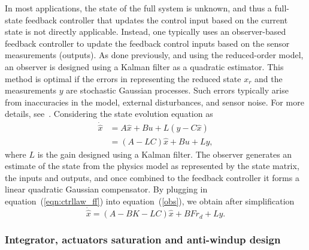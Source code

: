 \documentclass{iopart}
\begin{document}
In most applications, the state of the full system is unknown, and thus a full-state feedback controller that updates the control input based on the current state is not directly applicable. Instead, one typically uses an observer-based feedback controller to update the feedback control inputs based on the sensor measurements (outputs).
As done previously, and using the reduced-order model, an observer is designed using a Kalman filter as a quadratic estimator. This method is optimal if the errors in representing the reduced state $x_r$ and the measurements $y$ are stochastic Gaussian processes. 
Such errors typically arise from inaccuracies in the model, external disturbances, and sensor noise. For more details, see~\cite{SandP, AandM, Stengel}. 
Considering the state evolution equation as
\begin{equation}
	\begin{split}
		\dot{\hat{x}} &=  A \hat{x} + B u + L (y - C \hat{x}) \\
			&= (A- L C) \hat{x} + B u + L y,
		\label{obs}
	\end{split}
\end{equation}
 where $L$ is the gain designed using a Kalman filter.    
The observer generates an estimate of the state from the physics model as represented by the state matrix, the inputs and outputs, and once combined to the feedback controller it forms a linear quadratic Gaussian compensator.
By plugging in equation~(\ref{eqn:ctrllaw_ff}) into equation~(\ref{obs}), we obtain after simplification
\begin{equation}
      \dot{\hat{x}} =  (A- B K  -L C) \hat{x} + B F r_{d} + L y.
\end{equation}


\subsubsection{Integrator, actuators saturation and anti-windup design} 
\end{document}
